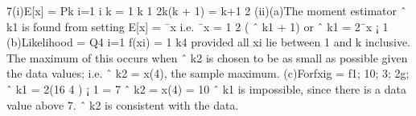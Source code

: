 \documentclass[a4paper,12pt]{article}
\begin{document}
7(i)E[x] =
Pk
i=1
i
k = 1
k
1
2k(k + 1) = k+1
2
(ii)(a)The moment estimator ˆ k1 is found from setting E[x] = ¯x i.e. ¯x = 1
2 ( ˆ k1 +
1) or ˆ k1 = 2¯x ¡ 1
(b)Likelihood =
Q4
i=1
f(xi) = 1
k4 provided all xi lie between 1 and k inclusive.
The maximum of this occurs when ˆ k2 is chosen to be as small as possible given the data
values; i.e. ˆ k2 = x(4), the sample maximum.
(c)Forfxig = f1; 10; 3; 2g; ˆ k1 = 2(16
4 ) ¡ 1 = 7 ˆ k2 = x(4) = 10
ˆ k1 is impossible, since there is a data value above 7. ˆ k2 is consistent with the data.
\end{document}

